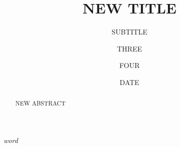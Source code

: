 \documentclass{book}
\title{NEW TITLE}
\subtitle{SUBTITLE}
\author{THREE \and FOUR}
\date{DATE}
\begin{document}
\maketitle

\begin{abstract}
NEW ABSTRACT
\end{abstract}

\tableofcontents

\textit{word}\par
\end{document}

